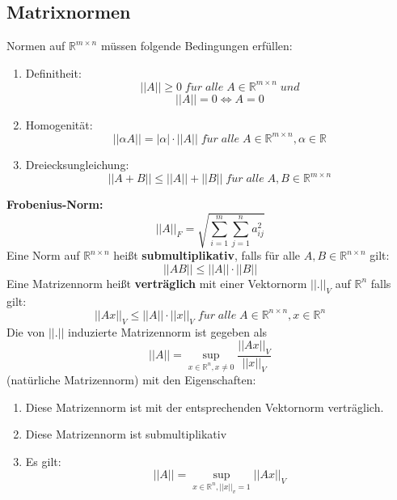 \documentclass[a4paper,twocolumn,10pt]{article}
\begin{document}
\subsection{Matrixnormen}
Normen auf $\mathbb{R}^{m\times n}$ müssen folgende Bedingungen erfüllen:
\begin{enumerate}[label=$\bullet$]
\item Definitheit:
\begin{equation*}
||A|| \geq 0\;f\ddot{u}r\;alle\;A\in\mathbb{R}^{m\times n}\;und
\end{equation*}
\begin{equation*}
||A||=0\Leftrightarrow A=0
\end{equation*}
\item Homogenität:
\begin{equation*}
||\alpha A|| =|\alpha|\cdot ||A||\;f\ddot{u}r\;alle\;A\in\mathbb{R}^{m\times n}, \alpha\in\mathbb{R}
\end{equation*}
\item Dreiecksungleichung:
\begin{equation*}
||A+B||\leq ||A||+||B||\;f\ddot{u}r\;alle\;A,B\in\mathbb{R}^{m\times n}
\end{equation*}
\end{enumerate}
\textbf{Frobenius-Norm:}\\
\begin{equation*}
||A||_F=\sqrt{\sum\limits_{i=1}^{m}\sum\limits_{j=1}^{n}a_{ij}^2}
\end{equation*}
Eine Norm auf $\mathbb{R}^{n\times n}$ heißt \textbf{submultiplikativ}, falls für alle $A,B\in\mathbb{R}^{n\times n}$ gilt:
\begin{equation*}
||AB||\leq ||A||\cdot ||B||
\end{equation*}
Eine Matrizennorm heißt \textbf{verträglich} mit einer Vektornorm $||.||_V$ auf $\mathbb{R}^n$ falls gilt:
\begin{equation*}
||Ax||_V\leq ||A||\cdot ||x||_V\;f\ddot{u}r\;alle\;A\in\mathbb{R}^{n\times n},x\in\mathbb{R}^n
\end{equation*}
Die von $||.||$ induzierte Matrizennorm ist gegeben als
\begin{equation*}
||A||=\sup\limits_{x\in\mathbb{R}^n,x\neq 0}\frac{||Ax||_V}{||x||_V}
\end{equation*}
(natürliche Matrizennorm) mit den Eigenschaften:
\begin{enumerate}[label=$\bullet$]
\item Diese Matrizennorm ist mit der entsprechenden Vektornorm verträglich.
\item Diese Matrizennorm ist submultiplikativ
\item Es gilt:
\begin{equation*}
||A||=\sup\limits_{x\in\mathbb{R}^n,||x||_v=1}||Ax||_V
\end{equation*}
\end{enumerate}
\end{document}
